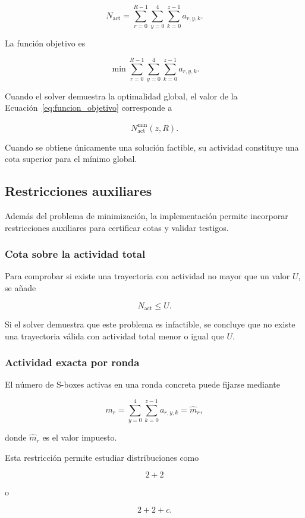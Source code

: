 \[
N_{\mathrm{act}}
=
\sum_{r=0}^{R-1}
\sum_{y=0}^{4}
\sum_{k=0}^{z-1}
a_{r,y,k}.
\]

La función objetivo es

\[
\min
\sum_{r=0}^{R-1}
\sum_{y=0}^{4}
\sum_{k=0}^{z-1}
a_{r,y,k}.
\label{eq:funcion_objetivo}
\]

Cuando el solver demuestra la optimalidad global, el valor de la
Ecuación~\ref{eq:funcion_objetivo} corresponde a

\[
N_{\mathrm{act}}^{\min}(z,R).
\]

Cuando se obtiene únicamente una solución factible, su actividad constituye
una cota superior para el mínimo global.


\subsection{Restricciones auxiliares}
\label{subsec:restricciones_auxiliares}

Además del problema de minimización, la implementación permite incorporar
restricciones auxiliares para certificar cotas y validar testigos.


\subsubsection{Cota sobre la actividad total}

Para comprobar si existe una trayectoria con actividad no mayor que un
valor $U$, se añade

\[
N_{\mathrm{act}} \leq U.
\]

Si el solver demuestra que este problema es infactible, se concluye que no
existe una trayectoria válida con actividad total menor o igual que $U$.


\subsubsection{Actividad exacta por ronda}

El número de S-boxes activas en una ronda concreta puede fijarse mediante

\[
m_r
=
\sum_{y=0}^{4}
\sum_{k=0}^{z-1}
a_{r,y,k}
=
\widehat{m}_r,
\]

donde $\widehat{m}_r$ es el valor impuesto.

Esta restricción permite estudiar distribuciones como

\[
2+2
\]

o

\[
2+2+c.
\]


